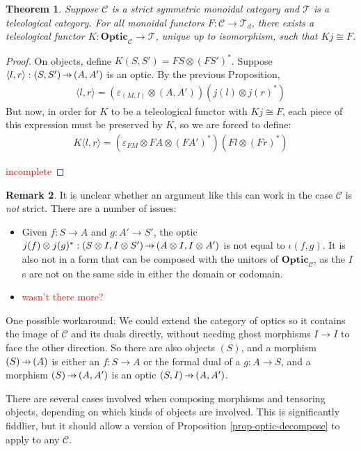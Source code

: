\documentclass[11pt,a4paper]{article}
\theoremstyle{plain}
\newtheorem{theorem}{Theorem}[subsection]
\theoremstyle{definition}
\newtheorem{remark}[theorem]{Remark}
\newcommand{\C}{\mathscr{C}}
\newcommand{\T}{\mathscr{T}}
\newcommand{\Optic}{\mathbf{Optic}}
\newcommand{\hto}{\ensuremath{\,\mathaccent\shortmid\rightarrow\,}}
\newcommand{\todo}[1]{\textcolor{red}{\small #1}}
\begin{document}
\begin{theorem}
\label{optic-is-free-teleological-cat}
Suppose $\C$ is a strict symmetric monoidal category and $\T$ is a teleological category. For all monoidal functors $F : \C \to \T_d$, there exists a teleological functor $K : \Optic_\C \to \T$, unique up to isomorphism, such that $Kj \cong F$.
\end{theorem}
\begin{proof}
On objects, define $K(S, S') = FS \otimes (FS')^*$. Suppose $\langle l, r \rangle : (S, S') \hto (A, A')$ is an optic. By the previous Proposition,
\begin{align*}
\langle l, r \rangle = (\varepsilon_{(M, I)} \otimes (A, A'))(j(l) \otimes j(r)^*)
\end{align*}
But now, in order for $K$ to be a teleological functor with $Kj \cong F$, each piece of this expression must be preserved by $K$, so we are forced to define:
\begin{align*}
K\langle l, r \rangle = (\varepsilon_{FM} \otimes FA \otimes (FA')^*)(Fl \otimes (Fr)^* )
\end{align*}
%
%

\todo{incomplete}
\end{proof}

\begin{remark}
It is unclear whether an argument like this can work in the case $\C$ is \emph{not} strict. There are a number of issues:

\begin{itemize}
\item Given $f : S \to A$ and $g : A' \to S'$, the optic $j(f) \otimes j(g)^* : (S \otimes I, I \otimes S') \hto (A \otimes I, I \otimes A')$ is not equal to $\iota(f, g)$. It is also not in a form that can be composed with the unitors of $\Optic_\C$, as the $I$s are not on the same side in either the domain or codomain.
\item \todo{wasn't there more?}
\end{itemize}

One possible workaround: We could extend the category of optics so it contains the image of $\C$ and its duals directly, without needing ghost morphisms $I \to I$ to face the other direction. So there are also objects $(S)$, and a morphism $(S) \hto (A)$ is either an $f : S \to A$ or the formal dual of a $g : A \to S$, and a morphism $(S) \hto (A, A')$ is an optic $(S, I) \hto (A, A')$. 

There are several cases involved when composing morphisms and tensoring objects, depending on which kinds of objects are involved. This is significantly fiddlier, but it should allow a version of Proposition \ref{prop-optic-decompose} to apply to any $\C$.
\end{remark}
\end{document}
